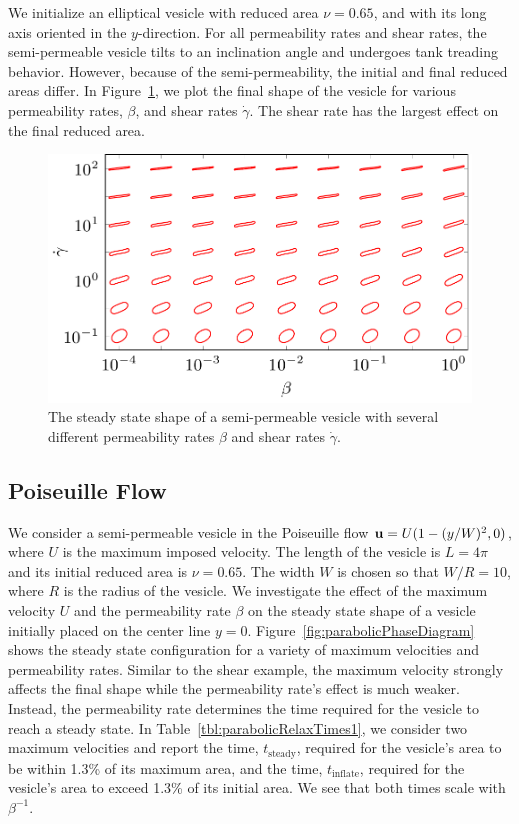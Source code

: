 \documentclass[9pt,twocolumn,twoside,lineno]{pnas-new}
\newif\ifTikz
\begin{document}
We initialize an elliptical vesicle with reduced area $\nu = 0.65$, and
with its long axis oriented in the $y$-direction. For all permeability
rates and shear rates, the semi-permeable vesicle tilts to an
inclination angle and undergoes tank treading behavior. However, because
of the semi-permeability, the initial and final reduced areas differ. In
Figure~\ref{fig:shearPhaseDiagram}, we plot the final shape of the
vesicle for various permeability rates, $\beta$, and shear rates
$\dot{\gamma}$. The shear rate has the largest effect on the final
reduced area.

\begin{figure}[htp]
  \centering
  \includegraphics[width=\linewidth]{figures/shearPhaseDiagramRA2.pdf}
  \caption{\label{fig:shearPhaseDiagram} The steady state shape of a
  semi-permeable vesicle with several different permeability rates
  $\beta$ and shear rates $\dot{\gamma}$.}
\end{figure}

\subsection*{Poiseuille Flow}
We consider a semi-permeable vesicle in the Poiseuille flow $\mathbf{u} =
U(1-(y/W)^2,0)$, where $U$ is the maximum imposed velocity. The length
of the vesicle is $L = 4\pi$ and its initial reduced area is $\nu =
0.65$. The width $W$ is chosen so that $W/R = 10$, where $R$ is the
radius of the vesicle. We investigate the effect of the maximum velocity
$U$ and the permeability rate $\beta$ on the steady state shape of a
vesicle initially placed on the center line $y=0$.
Figure~\ref{fig:parabolicPhaseDiagram} shows the steady state
configuration for a variety of maximum velocities and permeability
rates. Similar to the shear example, the maximum velocity strongly
affects the final shape while the permeability rate's effect is much
weaker. Instead, the permeability rate determines the time required for
the vesicle to reach a steady state. In
Table~\ref{tbl:parabolicRelaxTimes1}, we consider two maximum velocities
and report the time, $t_\mathrm{steady}$, required for the vesicle's
area to be within 1.3\% of its maximum area, and the time,
$t_\mathrm{inflate}$, required for the vesicle's area to exceed 1.3\% of
its initial area. We see that both times scale with $\beta^{-1}$. 
\end{document}
